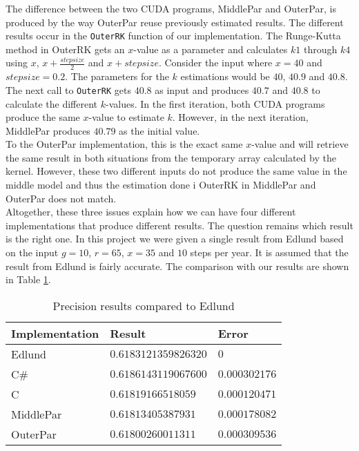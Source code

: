 The difference between the two CUDA programs, MiddlePar and OuterPar, is produced by the way OuterPar reuse previously estimated results. The different results occur in the \texttt{OuterRK} function of our implementation. The Runge-Kutta method in OuterRK gets an $x$-value as a parameter and calculates $k1$ through $k4$ using $x$, $x+\frac{stepsize}{2}$ and $x+stepsize$. Consider the input where $x = 40$ and $stepsize = 0.2$. The parameters for the $k$ estimations would be $40$, $40.9$ and $40.8$. The next call to \texttt{OuterRK} gets $40.8$ as input and produces $40.7$ and $40.8$ to calculate the different $k$-values. In the first iteration, both CUDA programs produce the same $x$-value to estimate $k$. However, in the next iteration, MiddlePar produces $40.79$ as the initial value. \\

To the OuterPar implementation, this is the exact same $x$-value and will retrieve the same result in both situations from the temporary array calculated by the kernel. However, these two different inputs do not produce the same value in the middle model and thus the estimation done i OuterRK in MiddlePar and OuterPar does not match.\\

Altogether, these three issues explain how we can have four different implementations that produce different results. The question remains which result is the right one. In this project we were given a single result from Edlund based on the input $g=10$, $r=65$, $x=35$ and $10$ steps per year. It is assumed that the result from Edlund is fairly accurate. The comparison with our results are shown in Table \ref{table:precision}.

\begin{table}
\begin{center}
\begin{tabular}[ht!]{|l|l|l|}
	\hline
\textbf{Implementation}&\textbf{Result}&\textbf{Error}\\\hline
Edlund&$0.6183121359826320$&$0$\\\hline
C\#&$0.6186143119067600$&$0.000302176$\\\hline
C&$0.61819166518059$&$0.000120471$\\\hline
MiddlePar&$0.61813405387931$&$0.000178082$\\\hline
OuterPar&$0.61800260011311$&$0.000309536$\\\hline
\end{tabular}
\end{center}
\caption{Precision results compared to Edlund}
\label{table:precision}
\end{table}

